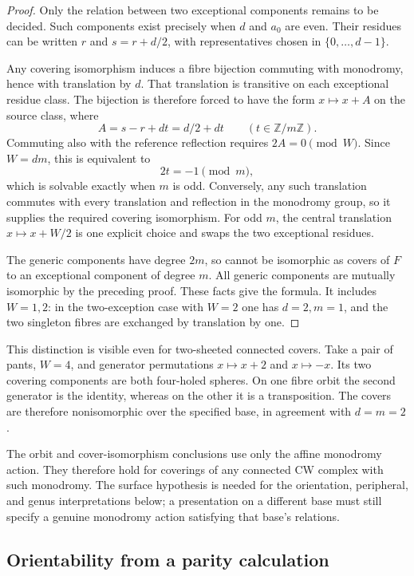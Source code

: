 \begin{proof}
Only the relation between two exceptional components remains to be
decided.  Such components exist precisely when $d$ and $a_0$ are even.
Their residues can be written $r$ and $s=r+d/2$, with representatives
chosen in $\{0,\ldots,d-1\}$.

Any covering isomorphism induces a fibre bijection commuting with
monodromy, hence with translation by $d$.  That translation is transitive
on each exceptional residue class.  The bijection is therefore forced
to have the form $x\mapsto x+A$ on the source class, where
\[
 A=s-r+dt=d/2+dt
 \qquad (t\in\mathbb Z/m\mathbb Z).
\]
Commuting also with the reference reflection requires
$2A=0\pmod W$.  Since $W=dm$, this is equivalent to
\[
 2t=-1\pmod m,
\]
which is solvable exactly when $m$ is odd.  Conversely, any such
translation commutes with every translation and reflection in the
monodromy group, so it supplies the required covering isomorphism.
For odd $m$, the central translation $x\mapsto x+W/2$ is one explicit
choice and swaps the two exceptional residues.

The generic components have degree $2m$, so cannot be isomorphic as
covers of $F$ to an exceptional component of degree $m$.  All generic
components are mutually isomorphic by the preceding proof.  These facts
give the formula.  It includes $W=1,2$: in the two-exception case with
$W=2$ one has $d=2,m=1$, and the two singleton fibres are exchanged by
translation by one.
\end{proof}

This distinction is visible even for two-sheeted connected covers.
Take a pair of pants, $W=4$, and generator permutations $x\mapsto x+2$
and $x\mapsto-x$.  Its two covering components are both four-holed
spheres.  On one fibre orbit the second generator is the identity,
whereas on the other it is a transposition.  The covers are therefore
nonisomorphic over the specified base, in agreement with $d=m=2$.

The orbit and cover-isomorphism conclusions use only the affine
monodromy action.  They therefore hold for coverings of any connected
CW complex with such monodromy.  The surface hypothesis is needed for
the orientation, peripheral, and genus interpretations below; a
presentation on a different base must still specify a genuine
monodromy action satisfying that base's relations.

\subsection{Orientability from a parity calculation}

